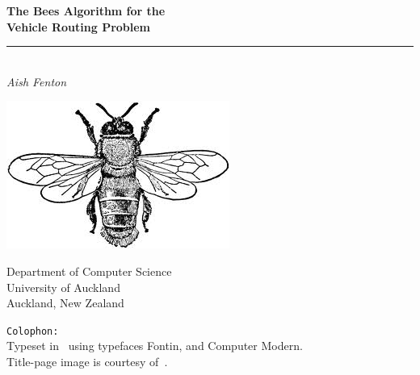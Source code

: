 

\begin{titlepage}


\vspace*{6em}

\begin{center}
   \LARGE\textbf{The Bees Algorithm for the\\ Vehicle Routing Problem\\}
   \rule{224pt}{0.75pt}\\
   \vspace*{0.75em}
   \rmfamily\large\textit{Aish Fenton}
\end{center}

\hspace{70pt}\includegraphics[scale=0.15, angle=315]{images/bee.jpeg}

\vfill
\small\rmfamily
\begin{flushright}
Department of Computer Science\\
University of Auckland \\
Auckland, New Zealand 
\end{flushright}

\end{titlepage}

\texttt{Colophon:}\\
Typeset in \XeTeX\ using typefaces  Fontin, \rmfamily and Computer Modern.\\
Title-page image is courtesy of~\cite{beeimage}.
